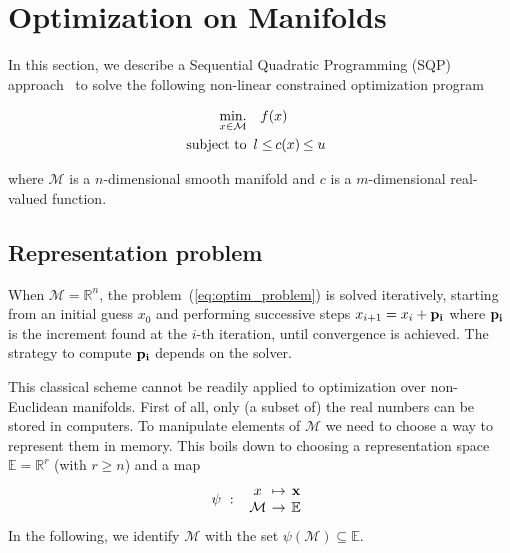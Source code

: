 \section{Optimization on Manifolds}
\label{sec:optimization_on_manifolds}

In this section, we describe a Sequential Quadratic Programming (SQP) approach~\cite{nocedal:book:2006} to solve the following non-linear constrained optimization program

\begin{align}
\label{eq:optim_problem}
  \minimize_{x \in \mathcal{M}} & \quad f(x)\\
  \text{subject to}&
  \begin{array}{rcl}
    {l} \leq & \reduce{c(x)}{8}& \leq {u} \nonumber
  \end{array}
\end{align}

where $\mathcal{M}$ is a $n$-dimensional smooth manifold and $c$ is a $m$-dimensional real-valued function.

\subsection{Representation problem}
When $\mathcal{M} = \mathbb{R}^n$, the problem~(\ref{eq:optim_problem}) is solved iteratively, starting from an initial guess $x_0$ and performing successive steps $x_{i+1} = x_i + {\bf p_i}$ where ${\bf p_i}$ is the increment found at the $i$-th iteration, until convergence is achieved. The strategy to compute ${\bf p_i}$ depends on the solver.

This classical scheme cannot be readily applied to optimization over non-Euclidean manifolds. First of all, only (a subset of) the real numbers can be stored in computers. To manipulate elements of $\mathcal{M}$ we need to choose a way to represent them in memory. This boils down to choosing a representation space $\mathbb{E} = \mathbb{R}^r$ (with $r \geq n$) and a map
\begin{equation}
  \psi\ :\
  \begin{array}{ccc}
    x & \reduce{\mapsto}{6} & \mathbf{x} \\
    \mathcal{M} & \reduce{\rightarrow}{6} & \mathbb{E}
  \end{array} \nonumber
\end{equation}
In the following, we identify $\mathcal{M}$ with the set $\psi(\mathcal{M}) \subseteq \mathbb{E}$.

